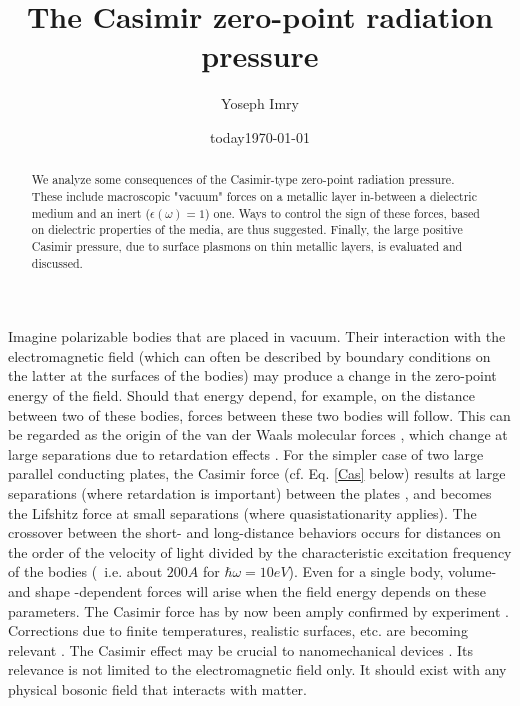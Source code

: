 \documentclass[prl,nofootinbib,twocolumn,showpacs]{revtex4}
\date{today}
\begin{document}
\begin{abstract}
\noindent We analyze some consequences of the Casimir-type zero-point radiation pressure.
These include macroscopic "vacuum" forces on a metallic layer in-between a dielectric
medium and an inert ($\epsilon (\omega) = 1$) one. Ways to control the sign of these
forces, based on dielectric properties of the media, are thus suggested. Finally, the
large positive Casimir pressure, due to surface plasmons on thin metallic layers, is
evaluated and discussed.
\end{abstract}
\title{The Casimir zero-point radiation pressure}
\author{Yoseph Imry}  
\date{\today}
\maketitle

Imagine polarizable bodies that are placed in vacuum. Their interaction
with the electromagnetic field (which  can often be described by boundary conditions on
the latter at the surfaces of the bodies) may produce a change in the
zero-point energy of the field.  Should that energy  depend, for example, on the distance
between two of these bodies,  forces between these two bodies will follow. This can
be regarded as the origin of the van der Waals molecular forces
\cite{London}, which change at large separations due to
retardation effects \cite{Casimir-Polder}. For the simpler case of two large parallel
conducting plates, the Casimir force \cite{Casimir} (cf. Eq. \ref{Cas} below) results at
large
separations (where retardation is important) between the plates , and becomes the
Lifshitz  force \cite{Lifshitz,Dzy} at small separations (where
quasistationarity applies). The crossover between the short- and
long-distance behaviors occurs for distances  on the order of the
velocity of light divided by the characteristic excitation
frequency of the bodies ({\ i.e.} about $200 A$ for $\hbar \omega = 10 eV$). Even for a single
body, volume- and shape \cite{B-dP}-dependent forces will arise when the field energy
depends on these parameters. The Casimir force has by now been
amply confirmed by experiment \cite{exp}. Corrections due to finite
temperatures, realistic surfaces, etc. are becoming relevant
\cite{Genet}. The Casimir effect may be crucial to nanomechanical
devices \cite{mech}. Its relevance is not limited to the electromagnetic
field only. It should exist with any physical bosonic field that interacts with
matter.
\end{document}
